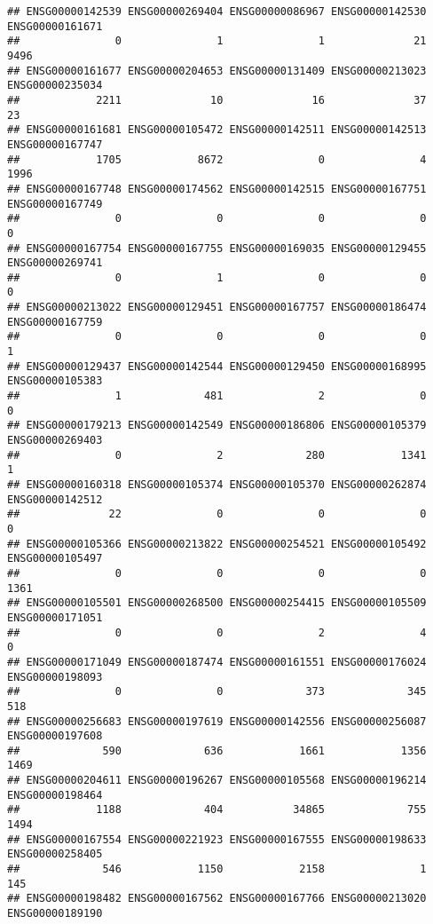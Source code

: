 \documentclass[
]{article}
\begin{document}
\begin{verbatim}
## ENSG00000142539 ENSG00000269404 ENSG00000086967 ENSG00000142530 ENSG00000161671 
##               0               1               1              21            9496 
## ENSG00000161677 ENSG00000204653 ENSG00000131409 ENSG00000213023 ENSG00000235034 
##            2211              10              16              37              23 
## ENSG00000161681 ENSG00000105472 ENSG00000142511 ENSG00000142513 ENSG00000167747 
##            1705            8672               0               4            1996 
## ENSG00000167748 ENSG00000174562 ENSG00000142515 ENSG00000167751 ENSG00000167749 
##               0               0               0               0               0 
## ENSG00000167754 ENSG00000167755 ENSG00000169035 ENSG00000129455 ENSG00000269741 
##               0               1               0               0               0 
## ENSG00000213022 ENSG00000129451 ENSG00000167757 ENSG00000186474 ENSG00000167759 
##               0               0               0               0               1 
## ENSG00000129437 ENSG00000142544 ENSG00000129450 ENSG00000168995 ENSG00000105383 
##               1             481               2               0               0 
## ENSG00000179213 ENSG00000142549 ENSG00000186806 ENSG00000105379 ENSG00000269403 
##               0               2             280            1341               1 
## ENSG00000160318 ENSG00000105374 ENSG00000105370 ENSG00000262874 ENSG00000142512 
##              22               0               0               0               0 
## ENSG00000105366 ENSG00000213822 ENSG00000254521 ENSG00000105492 ENSG00000105497 
##               0               0               0               0            1361 
## ENSG00000105501 ENSG00000268500 ENSG00000254415 ENSG00000105509 ENSG00000171051 
##               0               0               2               4               0 
## ENSG00000171049 ENSG00000187474 ENSG00000161551 ENSG00000176024 ENSG00000198093 
##               0               0             373             345             518 
## ENSG00000256683 ENSG00000197619 ENSG00000142556 ENSG00000256087 ENSG00000197608 
##             590             636            1661            1356            1469 
## ENSG00000204611 ENSG00000196267 ENSG00000105568 ENSG00000196214 ENSG00000198464 
##            1188             404           34865             755            1494 
## ENSG00000167554 ENSG00000221923 ENSG00000167555 ENSG00000198633 ENSG00000258405 
##             546            1150            2158               1             145 
## ENSG00000198482 ENSG00000167562 ENSG00000167766 ENSG00000213020 ENSG00000189190 

\end{verbatim}
\end{document}
